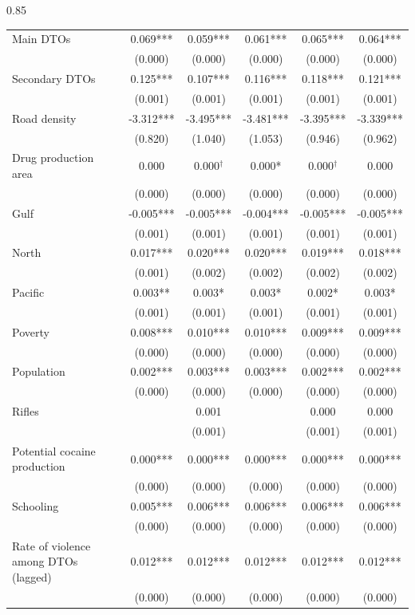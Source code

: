 \documentclass[12pt,letterpaper]{article}
\begin{document}
\begin{landscape}
\begin{center}
\begin{spacing}{0.85}
\begin{longtable}{lccccc}
Main DTOs & 0.069*** & 0.059*** & 0.061*** & 0.065*** & 0.064*** \\
 & (0.000)  & (0.000)  & (0.000)  & (0.000)  & (0.000)  \\
Secondary DTOs & 0.125*** & 0.107*** & 0.116*** & 0.118*** & 0.121*** \\
 & (0.001)  & (0.001)  & (0.001)  & (0.001)  & (0.001)  \\
Road density & -3.312*** & -3.495*** & -3.481*** & -3.395*** & -3.339*** \\
 & (0.820)  & (1.040)  & (1.053)  & (0.946)  & (0.962)  \\
Drug production area & 0.000  & 0.000$^{\dag}$ & 0.000* & 0.000$^{\dag}$ & 0.000  \\
 & (0.000)  & (0.000)  & (0.000)  & (0.000)  & (0.000)  \\
Gulf & -0.005*** & -0.005*** & -0.004*** & -0.005*** & -0.005*** \\
 & (0.001)  & (0.001)  & (0.001)  & (0.001)  & (0.001)  \\
North & 0.017*** & 0.020*** & 0.020*** & 0.019*** & 0.018*** \\
 & (0.001)  & (0.002)  & (0.002)  & (0.002)  & (0.002)  \\
Pacific & 0.003** & 0.003* & 0.003* & 0.002* & 0.003* \\
 & (0.001)  & (0.001)  & (0.001)  & (0.001)  & (0.001)  \\
Poverty & 0.008*** & 0.010*** & 0.010*** & 0.009*** & 0.009*** \\
 & (0.000)  & (0.000)  & (0.000)  & (0.000)  & (0.000)  \\
Population & 0.002*** & 0.003*** & 0.003*** & 0.002*** & 0.002*** \\
 & (0.000)  & (0.000)  & (0.000)  & (0.000)  & (0.000)  \\

Rifles &   & 0.001  &   & 0.000  & 0.000  \\
 &   & (0.001)  &   & (0.001)  & (0.001)  \\

Potential cocaine production & 0.000*** & 0.000*** & 0.000*** & 0.000*** & 0.000*** \\
 & (0.000)  & (0.000)  & (0.000)  & (0.000)  & (0.000)  \\
Schooling & 0.005*** & 0.006*** & 0.006*** & 0.006*** & 0.006*** \\
 & (0.000)  & (0.000)  & (0.000)  & (0.000)  & (0.000)  \\
Rate of violence among DTOs (lagged) & 0.012*** & 0.012*** & 0.012*** & 0.012*** & 0.012*** \\
 & (0.000)  & (0.000)  & (0.000)  & (0.000)  & (0.000)  \\


\end{longtable}
\end{spacing}
\end{center}
\end{landscape}
\end{document}
